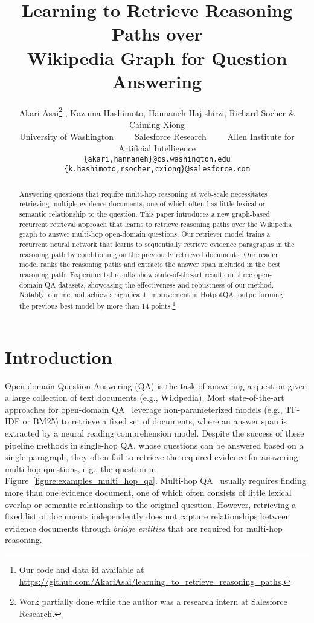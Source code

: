 \documentclass{article} \usepackage{iclr2020_conference,times}
\title{Learning to Retrieve Reasoning Paths over \\  Wikipedia Graph for  Question Answering }
\author{Akari Asai\thanks{Work partially done while the author was a research intern at Salesforce Research.} , Kazuma Hashimoto, Hannaneh Hajishirzi, Richard Socher \& Caiming Xiong \\
University of Washington~~~~~Salesforce Research~~~~~Allen Institute for Artificial Intelligence\\
\texttt{\{akari,hannaneh\}@cs.washington.edu} \\
\texttt{\{k.hashimoto,rsocher,cxiong\}@salesforce.com} \\
}
\begin{document}
\maketitle

\begin{abstract}
Answering questions that require multi-hop reasoning at web-scale necessitates retrieving multiple evidence documents, one of which often has little lexical or semantic relationship to the question. This paper introduces a new graph-based recurrent retrieval approach that learns to retrieve reasoning paths over the Wikipedia graph to answer multi-hop open-domain questions. 
Our retriever model trains a recurrent neural network that learns to sequentially retrieve evidence paragraphs in the reasoning path by conditioning on the previously retrieved documents. 
Our reader model ranks the reasoning paths and extracts the answer span included in the best reasoning path.
Experimental results show state-of-the-art results in three open-domain QA datasets, showcasing the effectiveness and robustness of our method. Notably, our method achieves significant improvement in HotpotQA, outperforming the previous best model by more than 14 points.\footnote{Our code and data id available at \url{https://github.com/AkariAsai/learning_to_retrieve_reasoning_paths}.}

\end{abstract}

\section{Introduction}



Open-domain Question Answering (QA) is the task of answering a question given a large collection of text documents (e.g., Wikipedia).
Most state-of-the-art approaches for open-domain QA~\citep{chen2017reading,wang2018r,lee2018ranking,yang-etal-2019-end-end} leverage non-parameterized models (e.g., TF-IDF or BM25) to retrieve a fixed set of documents, where an answer span is extracted by a neural reading comprehension model. 
Despite the success of these pipeline methods in single-hop QA, whose questions can be answered based on a single paragraph, they often fail to retrieve the required evidence for answering multi-hop questions, e.g., the question in Figure~\ref{figure:examples_multi_hop_qa}.
Multi-hop QA~\citep{yang-etal-2018-hotpotqa} usually requires finding more than one evidence document, one of which often consists of little lexical overlap or semantic relationship to the original question.
However, retrieving a fixed list of documents independently does not capture relationships between evidence documents through {\it bridge entities} that are required for multi-hop reasoning. 
\end{document}
